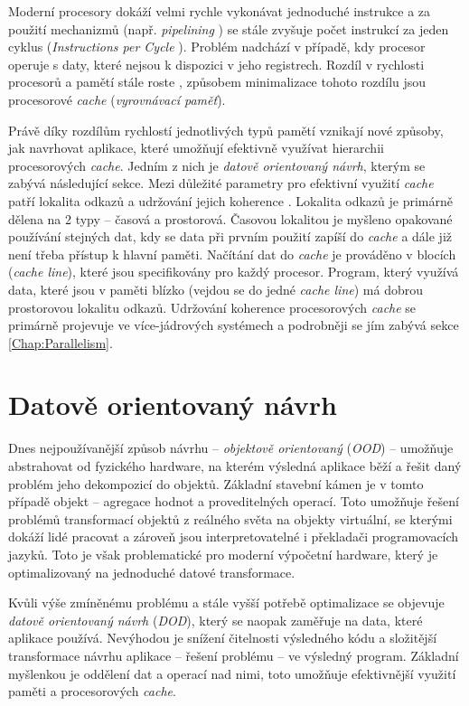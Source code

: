 Moderní procesory dokáží velmi rychle vykonávat jednoduché instrukce a za použití mechanizmů (např. \emph{pipelining} \cite{Pipelining}) se stále zvyšuje počet instrukcí za jeden cyklus (\emph{Instructions per Cycle} \cite{CpuIpc}). Problém nadchází v případě, kdy procesor operuje s daty, které nejsou k dispozici v jeho registrech. Rozdíl v rychlosti procesorů a pamětí stále roste \cite{CpuMemoryGap}, způsobem minimalizace tohoto rozdílu jsou procesorové \emph{cache} (\emph{vyrovnávací paměť}).

Právě díky rozdílům rychlostí jednotlivých typů pamětí \cite{MemoryTiming} vznikají nové způsoby, jak navrhovat aplikace, které umožňují efektivně využívat hierarchii procesorových \emph{cache}. Jedním z nich je \emph{datově orientovaný návrh}, kterým se zabývá následující sekce. Mezi důležité parametry pro efektivní využití \emph{cache} patří lokalita odkazů \cite{DataLocality} a udržování jejich koherence \cite{CacheCoherence}. Lokalita odkazů je primárně dělena na 2 typy -- časová a prostorová. Časovou lokalitou je myšleno opakované používání stejných dat, kdy se data při prvním použití zapíší do \emph{cache} a dále již není třeba přístup k hlavní paměti. Načítání dat do \emph{cache} je prováděno v blocích (\emph{cache line}), které jsou specifikovány pro každý procesor. Program, který využívá data, které jsou v paměti blízko (vejdou se do jedné \emph{cache line}) má dobrou prostorovou lokalitu odkazů. Udržování koherence procesorových \emph{cache} se primárně projevuje ve více-jádrových systémech a podrobněji se jím zabývá sekce \ref{Chap:Parallelism}.

\section{Datově orientovaný návrh}
\label{Chap:DDD}

Dnes nejpoužívanější způsob návrhu -- \emph{objektově orientovaný} (\emph{OOD}) -- umožňuje abstrahovat od fyzického hardware, na kterém výsledná aplikace běží a řešit daný problém jeho dekompozicí do objektů. Základní stavební kámen je v tomto případě objekt -- agregace hodnot a proveditelných operací. Toto umožňuje řešení problémů transformací objektů z reálného světa na objekty virtuální, se kterými dokáží lidé pracovat a zároveň jsou interpretovatelné i překladači programovacích jazyků. Toto je však problematické pro moderní výpočetní hardware, který je optimalizovaný na jednoduché datové transformace.

Kvůli výše zmíněnému problému a stále vyšší potřebě optimalizace se objevuje \emph{datově orientovaný návrh}\cite{DOD} (\emph{DOD}), který se naopak zaměřuje na data, které aplikace používá. Nevýhodou je snížení čitelnosti výsledného kódu a složitější transformace návrhu aplikace -- řešení problému -- ve výsledný program. Základní myšlenkou je oddělení dat a operací nad nimi, toto umožňuje efektivnější využití paměti a procesorových \emph{cache}.

